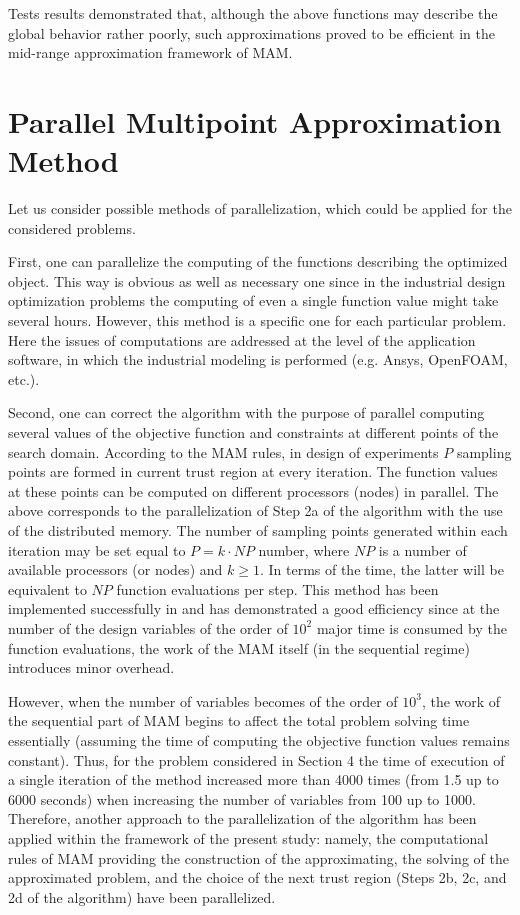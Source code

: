 \documentclass[runningheads,a4paper]{llncs}
\begin{document}
Tests results demonstrated that, although the above functions may describe the global behavior rather poorly, such approximations proved to be efficient in the mid-range approximation framework of MAM.

\section{Parallel Multipoint Approximation Method}\label{sec:par_alg}

Let us consider possible methods of parallelization, which could be applied for the considered problems.

First, one can parallelize the computing of the functions describing the optimized object. This way is obvious as well as necessary one since in the industrial design optimization problems the computing of even a single function value might take several hours. However, this method is a specific one for each particular problem. Here the issues of computations are addressed at the level of the application software, in which the industrial modeling is performed (e.g. Ansys, OpenFOAM, etc.).

Second, one can correct the algorithm with the purpose of parallel computing several values of the objective function and constraints at different points of the search domain. According to the MAM rules, in design of experiments $P$ 
sampling points are formed in current trust region at every iteration. The function values at these points can be computed on different processors (nodes) in parallel. The above corresponds to the parallelization of Step 2a of the algorithm with the use of the distributed memory. The number of sampling points generated within each iteration may be set equal to $P = k\cdot NP$ number, where $NP$ is a number of available processors (or nodes) and $k \geq 1$. In  terms of the time, the latter will be equivalent to $NP$ function evaluations per step. This method has been implemented successfully in \cite{PolynkinToropov2008} and has demonstrated a good efficiency since at the number of the design variables of the order of $10^2$ major time is consumed by the function evaluations, the work of the MAM itself (in the sequential regime) introduces minor overhead.

However, when the number of variables becomes of the order of $10^3$, the work of the sequential part of MAM begins to affect the total problem solving time essentially (assuming the time of computing the objective function 
values remains constant). Thus, for the problem considered in Section 4 the time of execution of a single iteration of the method increased more than 4000 times (from 1.5 up to 6000 seconds) when increasing the number of variables from 100 up to  1000. Therefore, another approach to the parallelization of the algorithm has been applied within the framework of the 
present study: namely, the computational rules of MAM  providing the construction of the approximating, the solving of the approximated problem, and the choice of the next trust region (Steps 2b, 2c, and 2d of the algorithm) have been parallelized.
\end{document}
